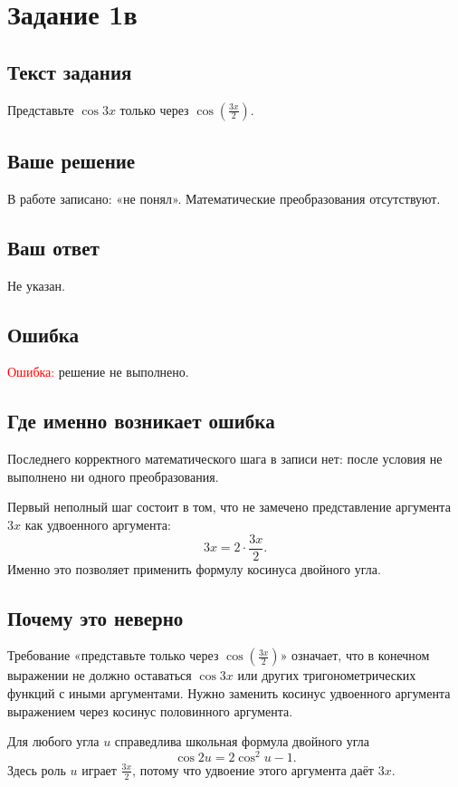 \documentclass[12pt,a4paper]{article}
\newcommand{\errorlabel}[1]{\textcolor{red}{Ошибка:} #1}
\begin{document}
\newpage
{}\label{task:1c}
\section*{Задание 1в}

\subsection*{Текст задания}
Представьте $\cos 3x$ только через $\cos\!\left(\frac{3x}{2}\right)$.

\subsection*{Ваше решение}
В работе записано: «не понял». Математические преобразования отсутствуют.

\subsection*{Ваш ответ}
Не указан.

\subsection*{Ошибка}
\errorlabel{решение не выполнено.}

\subsection*{Где именно возникает ошибка}
Последнего корректного математического шага в записи нет: после условия не выполнено ни одного преобразования.

Первый неполный шаг состоит в том, что не замечено представление аргумента $3x$ как удвоенного аргумента:
\[
3x=2\cdot\frac{3x}{2}.
\]
Именно это позволяет применить формулу косинуса двойного угла.

\subsection*{Почему это неверно}
Требование «представьте только через $\cos\!\left(\frac{3x}{2}\right)$» означает, что в конечном выражении не должно оставаться $\cos 3x$ или других тригонометрических функций с иными аргументами. Нужно заменить косинус удвоенного аргумента выражением через косинус половинного аргумента.

Для любого угла $u$ справедлива школьная формула двойного угла
\[
\cos 2u=2\cos^2u-1.
\]
Здесь роль $u$ играет $\frac{3x}{2}$, потому что удвоение этого аргумента даёт $3x$.
\end{document}
